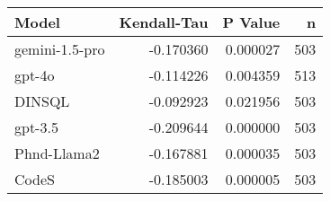 \begin{tabular}{lrrr}
\toprule
Model & Kendall-Tau & P Value & n \\
\midrule
gemini-1.5-pro & -0.170360 & 0.000027 & 503 \\
gpt-4o & -0.114226 & 0.004359 & 513 \\
DINSQL & -0.092923 & 0.021956 & 503 \\
gpt-3.5 & -0.209644 & 0.000000 & 503 \\
Phnd-Llama2 & -0.167881 & 0.000035 & 503 \\
CodeS & -0.185003 & 0.000005 & 503 \\
\bottomrule
\end{tabular}

